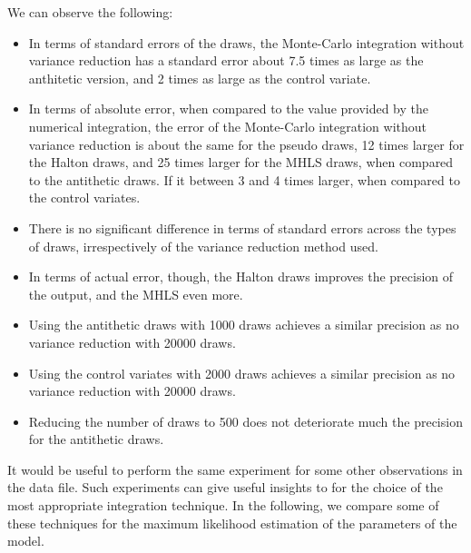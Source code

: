 \documentclass[12pt,a4paper]{article}
\begin{document}
We can observe the following:
\begin{itemize}
\item In terms of standard errors of the draws, the Monte-Carlo
  integration without variance reduction has a standard error about
  7.5 times as large as the anthitetic version, and 2 times as large
  as the control variate.
\item In terms of absolute error, when compared to the value provided
  by the numerical integration, the error of the Monte-Carlo
  integration without variance  reduction is about the same for the pseudo
  draws, 12 times larger for the Halton draws, and 25 times larger for
  the MHLS draws, when compared to the antithetic draws. If it between
  3 and 4 times larger, when compared to the control variates. 
\item There is no significant
  difference in terms of standard errors  across the
  types of draws, irrespectively of the variance reduction method
  used. 
\item In terms of actual error, though, the Halton draws improves the
precision of the output, and the MHLS even more.  
\item Using the antithetic draws with 1000 draws achieves a similar
  precision as no variance reduction with 20000 draws.
\item Using the control variates with 2000 draws achieves a similar
  precision as no variance reduction with 20000 draws.
\item Reducing the number of draws to 500 does not deteriorate much
  the precision for the antithetic draws.
\end{itemize}

It would be useful to perform the same experiment for some other
observations in the data file. Such experiments can give useful
insights to for the choice of the most appropriate integration
technique. In the following, we compare some of these techniques for
the maximum likelihood estimation of the parameters of the model.
\end{document}
